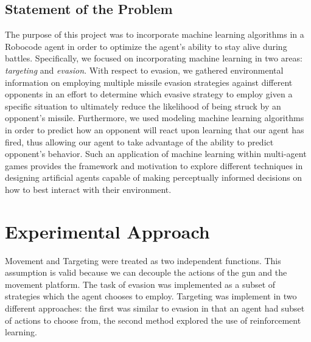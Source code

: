 \documentclass{article}
\theoremstyle{plain}
\theoremstyle{definition}
\theoremstyle{remark}
\begin{document}
\subsection*{Statement of the Problem}

The purpose of this project was to incorporate machine learning algorithms in a Robocode agent in order to optimize the agent's ability to stay alive during battles. Specifically, we focused on incorporating machine learning in two areas: \emph{targeting} and \emph{evasion}. With respect to evasion, we gathered environmental information on employing multiple missile evasion strategies against different opponents in an effort to determine which evasive strategy to employ given a specific situation to ultimately reduce the likelihood of being struck by an opponent's missile.  Furthermore, we used modeling machine learning algorithms in order to predict how an opponent will react upon learning that our agent has fired, thus allowing our agent to take advantage of the ability to predict opponent's behavior. Such an application of machine learning within multi-agent games provides the framework and motivation to explore different techniques in designing artificial agents capable of making perceptually informed decisions on how to best interact with their environment. 

\section{Experimental Approach}

Movement and Targeting were treated as two independent functions. This assumption is valid because we can decouple the actions of the gun and the movement platform. The task of evasion was implemented as a subset of strategies which the agent chooses to employ. Targeting was implement in two different approaches: the first was similar to evasion in that an agent had subset of actions to choose from, the second method explored the use of reinforcement learning.

\end{document}
